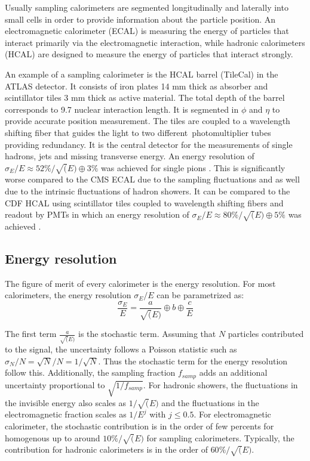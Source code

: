 Usually sampling calorimeters are segmented longitudinally and laterally into small cells in order to provide information about the particle position. An electromagnetic calorimeter (ECAL) is measuring the energy of particles that interact primarily via the electromagnetic interaction, while hadronic calorimeters (HCAL) are designed to measure the energy of particles that interact strongly.

An example of a sampling calorimeter is the HCAL barrel (TileCal) in the ATLAS detector. It consists of iron plates 14 mm thick as absorber and scintillator tiles 3 mm thick as active material. The total depth of the barrel corresponds to 9.7 nuclear interaction length. It is segmented in $\phi$ and $\eta$ to provide accurate position measurement. The tiles are coupled to a wavelength shifting fiber that guides the light to two different photomultiplier tubes providing redundancy. It is the central detector for the measurements of single hadrons, jets and missing transverse energy. An energy resolution of $\sigma_E/E \approx 52\%/\sqrt(E) \oplus 3\%$ was achieved for single pions \cite{Henriques:2015fso}. This is significantly worse compared to the CMS ECAL due to the sampling fluctuations and as well due to the intrinsic fluctuations of hadron showers. It can be compared to the CDF HCAL using scintillator tiles coupled to wavelength shifting fibers and readout by PMTs in which an energy resolution of $\sigma_E/E \approx 80\%/\sqrt(E) \oplus 5\%$ was achieved \cite{Blair:1996kx}.

\subsection{Energy resolution}
\label{subsec:EnergyReso}

The figure of merit of every calorimeter is the energy resolution. For most calorimeters, the energy resolution $\sigma_E/E$ can be parametrized as:
\begin{equation} \label{eq:EnergyReso}
  \frac{\sigma_E}{E} = \frac{a}{\sqrt(E)} \oplus b \oplus \frac{c}{E}
\end{equation}

The first term $\frac{a}{\sqrt(E)}$ is the stochastic term. Assuming that $N$ particles contributed to the signal, the uncertainty follows a Poisson statistic such as $\sigma_N/N = \sqrt{N}/N = 1/\sqrt{N}$. Thus the stochastic term for the energy resolution follow this. Additionally, the sampling fraction $f_{samp}$ adds an additional uncertainty proportional to $\sqrt{1/f_{samp}}$. For hadronic showers, the fluctuations in the invisible energy also scales as $1/\sqrt(E)$ and the fluctuations in the electromagnetic fraction scales as $1/E^j$ with $j \leq 0.5$. For electromagnetic calorimeter, the stochastic contribution is in the order of few percents for homogenous up to around $10\%/\sqrt(E)$ for sampling calorimeters. Typically, the contribution for hadronic calorimeters is in the order of $60\%/\sqrt(E)$.


